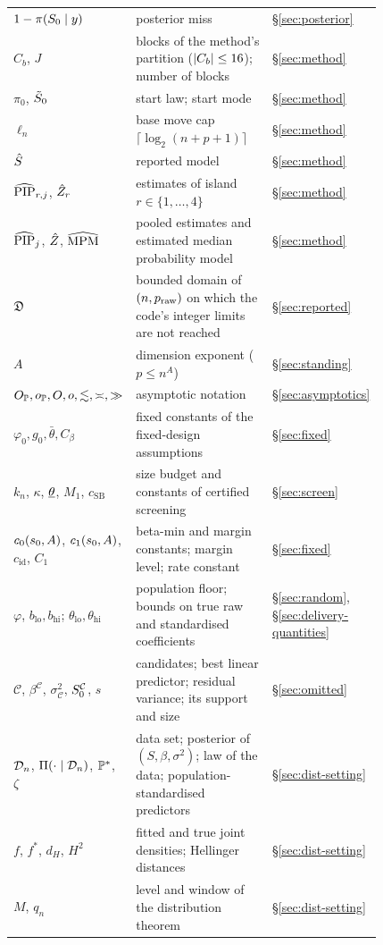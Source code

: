 \begin{longtable}{@{}p{0.27\linewidth}p{0.55\linewidth}l@{}}
$1-\pis{\Sz}$ & posterior miss & \S\ref{sec:posterior} \\
$C_b$, $J$ & blocks of the method's partition ($\abs{C_b}\le16$); number of blocks & \S\ref{sec:method} \\
$\pi_0$, $\tSz$ & start law; start mode & \S\ref{sec:method} \\
$\ell_n$ & base move cap $\lceil\log_2(n+p+1)\rceil$ & \S\ref{sec:method} \\
$\Shat$ & reported model & \S\ref{sec:method} \\
$\PIPhat_{r,j}$, $\Zhat_r$ & estimates of island $r\in\{1,\dots,4\}$ & \S\ref{sec:method} \\
$\PIPhat_j$, $\Zhat$, $\MPMhat$ & pooled estimates and estimated median probability model & \S\ref{sec:method} \\
$\Dom$ & bounded domain of $(n,\praw)$ on which the code's integer limits are not reached & \S\ref{sec:reported} \\
$A$ & dimension exponent ($p\le n^A$) & \S\ref{sec:standing} \\
$\OP,\oP,O,o,\lesssim,\asymp,\gg$ & asymptotic notation & \S\ref{sec:asymptotics} \\
$\varphi_0,g_0,\bar\theta,C_\beta$ & fixed constants of the fixed-design assumptions & \S\ref{sec:fixed} \\
$k_n$, $\kappa$, $\tlow$, $M_1$, $c_{\mathrm{SB}}$ & size budget and constants of certified screening & \S\ref{sec:screen} \\
$c_0(\sz,A)$, $c_1(\sz,A)$, $c_{\mathrm{id}}$, $C_1$ & beta-min and margin constants; margin level; rate constant & \S\ref{sec:fixed} \\
$\varphi$, $b_{\mathrm{lo}},b_{\mathrm{hi}}$; $\theta_{\mathrm{lo}},\theta_{\mathrm{hi}}$ & population floor; bounds on true raw and standardised coefficients & \S\ref{sec:random}, \S\ref{sec:delivery-quantities} \\
$\mathcal C$, $\beta^{\mathcal C}$, $\sigma^2_{\mathcal C}$, $\Sz^{\mathcal C}$, $s$ & candidates; best linear predictor; residual variance; its support and size & \S\ref{sec:omitted} \\
$\Dn$, $\Pi(\cdot\mid\Dn)$, $\P^*$, $\zeta$ & data set; posterior of $(S,\beta,\sigma^2)$; law of the data; population-standardised predictors & \S\ref{sec:dist-setting} \\
$f$, $f^*$, $d_H$, $H^2$ & fitted and true joint densities; Hellinger distances & \S\ref{sec:dist-setting} \\
$M$, $q_n$ & level and window of the distribution theorem & \S\ref{sec:dist-setting} \\

\end{longtable}
